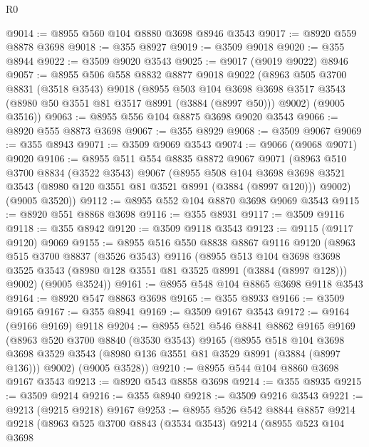 \begin{lexlean}{R0}
\begin{coremodule}
@9014 := @8955 @560 @104 @8880 @3698 @8946 @3543
@9017 := @8920 @559 @8878 @3698
@9018 := @355 @8927
@9019 := @3509 @9018
@9020 := @355 @8944
@9022 := @3509 @9020 @3543
@9025 := @9017 (@9019 @9022) @8946
@9057 := @8955
    @506
    @558
    @8832
    @8877
    @9018
    @9022
    (@8963
      @505
      @3700
      @8831
      (@3518 @3543)
      @9018
      (@8955
        @503
        @104
        @3698
        @3698
        @3517
        @3543
        (@8980 @50 @3551 @81 @3517 @8991 (@3884 (@8997 @50)))
        @9002)
      (@9005 @3516))
@9063 := @8955 @556 @104 @8875 @3698 @9020 @3543
@9066 := @8920 @555 @8873 @3698
@9067 := @355 @8929
@9068 := @3509 @9067
@9069 := @355 @8943
@9071 := @3509 @9069 @3543
@9074 := @9066 (@9068 @9071) @9020
@9106 := @8955
    @511
    @554
    @8835
    @8872
    @9067
    @9071
    (@8963
      @510
      @3700
      @8834
      (@3522 @3543)
      @9067
      (@8955
        @508
        @104
        @3698
        @3698
        @3521
        @3543
        (@8980 @120 @3551 @81 @3521 @8991 (@3884 (@8997 @120)))
        @9002)
      (@9005 @3520))
@9112 := @8955 @552 @104 @8870 @3698 @9069 @3543
@9115 := @8920 @551 @8868 @3698
@9116 := @355 @8931
@9117 := @3509 @9116
@9118 := @355 @8942
@9120 := @3509 @9118 @3543
@9123 := @9115 (@9117 @9120) @9069
@9155 := @8955
    @516
    @550
    @8838
    @8867
    @9116
    @9120
    (@8963
      @515
      @3700
      @8837
      (@3526 @3543)
      @9116
      (@8955
        @513
        @104
        @3698
        @3698
        @3525
        @3543
        (@8980 @128 @3551 @81 @3525 @8991 (@3884 (@8997 @128)))
        @9002)
      (@9005 @3524))
@9161 := @8955 @548 @104 @8865 @3698 @9118 @3543
@9164 := @8920 @547 @8863 @3698
@9165 := @355 @8933
@9166 := @3509 @9165
@9167 := @355 @8941
@9169 := @3509 @9167 @3543
@9172 := @9164 (@9166 @9169) @9118
@9204 := @8955
    @521
    @546
    @8841
    @8862
    @9165
    @9169
    (@8963
      @520
      @3700
      @8840
      (@3530 @3543)
      @9165
      (@8955
        @518
        @104
        @3698
        @3698
        @3529
        @3543
        (@8980 @136 @3551 @81 @3529 @8991 (@3884 (@8997 @136)))
        @9002)
      (@9005 @3528))
@9210 := @8955 @544 @104 @8860 @3698 @9167 @3543
@9213 := @8920 @543 @8858 @3698
@9214 := @355 @8935
@9215 := @3509 @9214
@9216 := @355 @8940
@9218 := @3509 @9216 @3543
@9221 := @9213 (@9215 @9218) @9167
@9253 := @8955
    @526
    @542
    @8844
    @8857
    @9214
    @9218
    (@8963
      @525
      @3700
      @8843
      (@3534 @3543)
      @9214
      (@8955
        @523
        @104
        @3698

\end{coremodule}
\end{lexlean}
